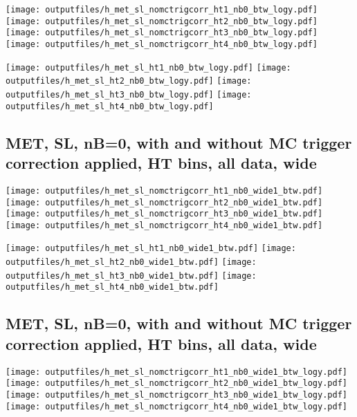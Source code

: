 \documentclass[11pt]{article}
\begin{document}
    \noindent
     \texttt{[image: outputfiles/h\_met\_sl\_nomctrigcorr\_ht1\_nb0\_btw\_logy.pdf]}
     \texttt{[image: outputfiles/h\_met\_sl\_nomctrigcorr\_ht2\_nb0\_btw\_logy.pdf]}
     \texttt{[image: outputfiles/h\_met\_sl\_nomctrigcorr\_ht3\_nb0\_btw\_logy.pdf]}
     \texttt{[image: outputfiles/h\_met\_sl\_nomctrigcorr\_ht4\_nb0\_btw\_logy.pdf]}


    \noindent
     \texttt{[image: outputfiles/h\_met\_sl\_ht1\_nb0\_btw\_logy.pdf]}
     \texttt{[image: outputfiles/h\_met\_sl\_ht2\_nb0\_btw\_logy.pdf]}
     \texttt{[image: outputfiles/h\_met\_sl\_ht3\_nb0\_btw\_logy.pdf]}
     \texttt{[image: outputfiles/h\_met\_sl\_ht4\_nb0\_btw\_logy.pdf]}


     \clearpage
     \subsection{ MET, SL, nB=0, with and without MC trigger correction applied, HT bins, all data, wide}

    \noindent
     \texttt{[image: outputfiles/h\_met\_sl\_nomctrigcorr\_ht1\_nb0\_wide1\_btw.pdf]}
     \texttt{[image: outputfiles/h\_met\_sl\_nomctrigcorr\_ht2\_nb0\_wide1\_btw.pdf]}
     \texttt{[image: outputfiles/h\_met\_sl\_nomctrigcorr\_ht3\_nb0\_wide1\_btw.pdf]}
     \texttt{[image: outputfiles/h\_met\_sl\_nomctrigcorr\_ht4\_nb0\_wide1\_btw.pdf]}

    \noindent
     \texttt{[image: outputfiles/h\_met\_sl\_ht1\_nb0\_wide1\_btw.pdf]}
     \texttt{[image: outputfiles/h\_met\_sl\_ht2\_nb0\_wide1\_btw.pdf]}
     \texttt{[image: outputfiles/h\_met\_sl\_ht3\_nb0\_wide1\_btw.pdf]}
     \texttt{[image: outputfiles/h\_met\_sl\_ht4\_nb0\_wide1\_btw.pdf]}

    \clearpage
     \subsection{ MET, SL, nB=0, with and without MC trigger correction applied, HT bins, all data, wide}

    \noindent
     \texttt{[image: outputfiles/h\_met\_sl\_nomctrigcorr\_ht1\_nb0\_wide1\_btw\_logy.pdf]}
     \texttt{[image: outputfiles/h\_met\_sl\_nomctrigcorr\_ht2\_nb0\_wide1\_btw\_logy.pdf]}
     \texttt{[image: outputfiles/h\_met\_sl\_nomctrigcorr\_ht3\_nb0\_wide1\_btw\_logy.pdf]}
     \texttt{[image: outputfiles/h\_met\_sl\_nomctrigcorr\_ht4\_nb0\_wide1\_btw\_logy.pdf]}
\end{document}
